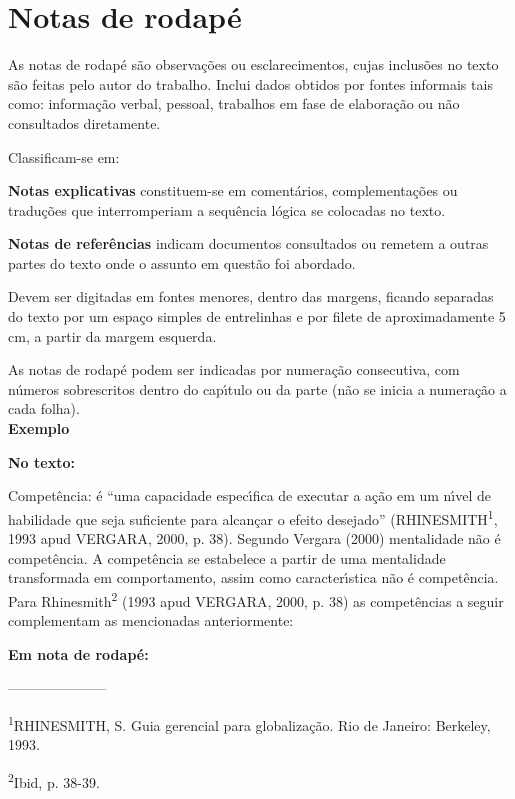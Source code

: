 \section{Notas de rodap\'e}
As notas de rodap\'e s\~ao observa\c{c}\~oes ou esclarecimentos, cujas inclus\~oes no texto s\~ao feitas pelo autor do trabalho. Inclui dados obtidos por fontes informais tais como: informa\c{c}\~ao verbal, pessoal, trabalhos em fase de elabora\c{c}\~ao ou n\~ao consultados diretamente.

\newpage

Classificam-se em:\\
\begin{alineas}
\item
\textbf{Notas explicativas} constituem-se em coment\'arios, complementa\c{c}\~oes ou tradu\c{c}\~oes que interromperiam a sequ\^encia l\'ogica se colocadas no texto. \cite{Soares2002}

\item
\textbf{Notas de refer\^encias} indicam documentos consultados ou remetem a outras partes do texto onde o assunto em quest\~ao foi abordado. \\
\end{alineas}

Devem ser digitadas em fontes menores, dentro das margens, ficando separadas do texto por um espa\c{c}o simples de entrelinhas e por filete de aproximadamente 5 cm, a partir da margem esquerda.

As notas de rodap\'e podem ser indicadas por numera\c{c}\~ao consecutiva, com n\'umeros sobrescritos dentro do cap\'{\i}tulo ou da parte (n\~ao se inicia a numera\c{c}\~ao a cada folha).\\

\textbf{Exemplo}

\begin{alineas}

\item

\textbf{No texto:}

Compet\^encia: \'e “uma capacidade espec\'{\i}fica de executar a a\c{c}\~ao em um n\'{\i}vel de habilidade que seja suficiente para alcan\c{c}ar o efeito desejado” (RHINESMITH\textsuperscript{1}, 1993 apud VERGARA, 2000, p. 38).
Segundo Vergara (2000) mentalidade n\~ao \'e compet\^encia. A compet\^encia se estabelece a partir de uma mentalidade transformada em comportamento, assim como caracter\'{\i}stica n\~ao \'e compet\^encia.
Para Rhinesmith\textsuperscript{2} (1993 apud VERGARA, 2000, p. 38) as compet\^encias a seguir complementam as mencionadas anteriormente:

\textbf{Em nota de rodap\'e:}

---------------------

\textsuperscript{1}RHINESMITH, S. Guia gerencial para globaliza\c{c}\~ao. Rio de Janeiro: Berkeley, 1993.

\textsuperscript{2}Ibid, p. 38-39.


\end{alineas}

